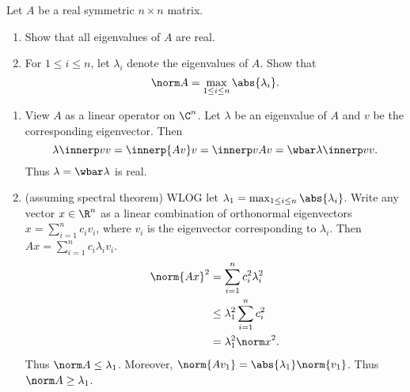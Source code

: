 \documentclass[12pt]{article}
\begin{document}
\begin{problem} \label{prb:operator-eigen}
    Let $A$ be a real symmetric $n \times n$ matrix.
    \begin{enumerate}
        \item Show that all eigenvalues of $A$ are real.
        \item For $1 \le i \le n$, let $\lambda_i$ denote the eigenvalues of $A$.
            Show that \[
                \norm A = \max_{1 \le i \le n} \abs{\lambda_i}.
            \]
    \end{enumerate}
\end{problem}
\begin{solution} \leavevmode
    \begin{enumerate}
        \item View $A$ as a linear operator on $\C^n$.
            Let $\lambda$ be an eigenvalue of $A$ and $v$ be the
            corresponding eigenvector.
            Then \[
                \lambda \innerp v v
                    = \innerp{Av} v
                    = \innerp v{Av}
                    = \wbar\lambda \innerp v v.
            \] Thus $\lambda = \wbar\lambda$ is real.
        \item (assuming spectral theorem)
            WLOG let $\lambda_1 = \max_{1 \le i \le n} \abs{\lambda_i}$.
            Write any vector $x \in \R^n$ as a linear combination of
            orthonormal eigenvectors $x = \sum_{i=1}^n c_i v_i$,
            where $v_i$ is the eigenvector corresponding to $\lambda_i$.
            Then $Ax = \sum_{i=1}^n c_i \lambda_i v_i$.
            \begin{align*}
                {\norm{Ax}}^2 &= \sum_{i=1}^n c_i^2 \lambda_i^2 \\
                &\le \lambda_1^2 \sum_{i=1}^n c_i^2 \\
                &= \lambda_1^2 {\norm x}^2.
            \end{align*}
            Thus $\norm A \le \lambda_1$.
            Moreover, $\norm{Av_1} = \abs{\lambda_1} \norm{v_1}$.
            Thus $\norm A \ge \lambda_1$. \qedhere
    \end{enumerate}
\end{solution}
\end{document}
